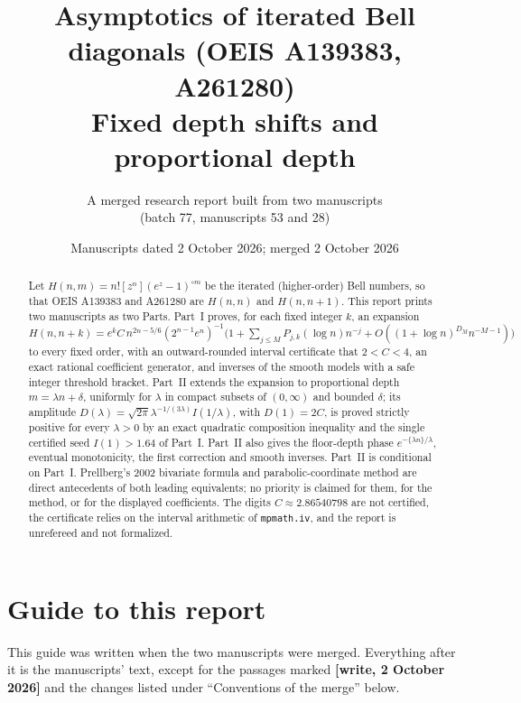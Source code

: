 \documentclass[11pt,letterpaper]{article}
\title{Asymptotics of iterated Bell diagonals (OEIS A139383, A261280)\\[4pt]
\large Fixed depth shifts and proportional depth}
\author{A merged research report built from two manuscripts\\
(batch 77, manuscripts 53 and 28)}
\date{Manuscripts dated 2 October 2026; merged 2 October 2026}
\theoremstyle{remark}\newtheorem{remark}[theorem]{Remark}
\begin{document}
\maketitle
\begin{abstract}
Let $H(n,m)=n![z^n](e^z-1)^{\circ m}$ be the iterated (higher-order) Bell numbers, so that OEIS A139383 and A261280 are $H(n,n)$ and $H(n,n+1)$. This report prints two manuscripts as two Parts. Part~I proves, for each fixed integer $k$, an expansion $H(n,n+k)=e^kC\,n^{2n-5/6}(2^{n-1}e^n)^{-1}\bigl(1+\sum_{j\le M}P_{j,k}(\log n)n^{-j}+O((1+\log n)^{D_M}n^{-M-1})\bigr)$ to every fixed order, with an outward-rounded interval certificate that $2<C<4$, an exact rational coefficient generator, and inverses of the smooth models with a safe integer threshold bracket. Part~II extends the expansion to proportional depth $m=\lambda n+\delta$, uniformly for $\lambda$ in compact subsets of $(0,\infty)$ and bounded $\delta$; its amplitude $D(\lambda)=\sqrt{2\pi}\lambda^{-1/(3\lambda)}I(1/\lambda)$, with $D(1)=2C$, is proved strictly positive for every $\lambda>0$ by an exact quadratic composition inequality and the single certified seed $I(1)>1.64$ of Part~I. Part~II also gives the floor-depth phase $e^{-\{\lambda n\}/\lambda}$, eventual monotonicity, the first correction and smooth inverses. Part~II is conditional on Part~I. Prellberg's 2002 bivariate formula and parabolic-coordinate method are direct antecedents of both leading equivalents; no priority is claimed for them, for the method, or for the displayed coefficients. The digits $C\approx2.86540798$ are not certified, the certificate relies on the interval arithmetic of \texttt{mpmath.iv}, and the report is unrefereed and not formalized.
\end{abstract}
\setcounter{tocdepth}{2}
\tableofcontents

\section*{Guide to this report}
\label{ibd:guide}
This guide was written when the two manuscripts were merged. Everything after it is the manuscripts' text, except for the passages marked \textbf{[write, 2 October 2026]} and the changes listed under ``Conventions of the merge'' below.
\end{document}
